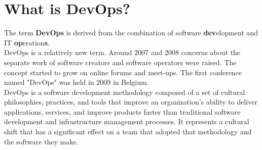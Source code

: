 \section{What is DevOps?} The term \textbf{DevOps} is derived from the combination of software \textbf{dev}elopment and IT \textbf{op}eration\textbf{s}.\\
DevOps is a relatively new term. Around 2007 and 2008 concerns about the separate work of software creators and software operators were raised. The concept started to grow on online forums and meet-ups. The first conference named "DevOps" was held in 2009 in Belgium.\\
DevOps is a software development methodology composed of a set of cultural philosophies, practices, and tools that improve an organization's ability to deliver applications, services, and improve products faster than traditional software development and infrastructure management processes. It represents a cultural shift that has a significant effect on a team that adopted that methodology and the software they make.\cite{devops-atl,devops-wiki}


